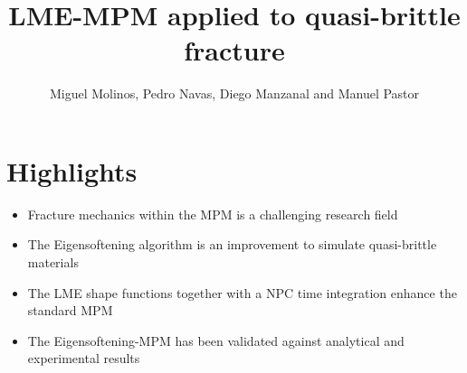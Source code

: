 \documentclass[12pt,a4paper]{article}
\title{LME-MPM applied to quasi-brittle fracture}
\author{Miguel Molinos, Pedro Navas, Diego Manzanal and Manuel Pastor}
\begin{document}
\maketitle

\centering
\section*{Highlights}
\setlength{\parskip}{1cm plus 5mm minus 4mm}
\begin{itemize}
\item Fracture mechanics within the MPM is a challenging research field

\item The Eigensoftening algorithm is an improvement to simulate quasi-brittle materials

\item The LME shape functions together with a NPC time integration enhance the standard MPM

\item The Eigensoftening-MPM has been validated against analytical and experimental results

\end{itemize}
\end{document}
